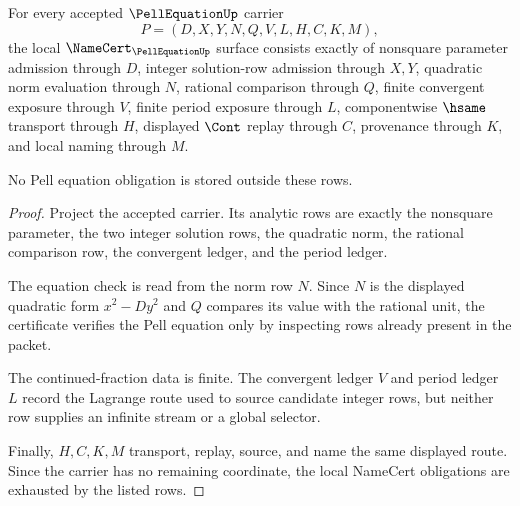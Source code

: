\begin{theorem}
\label{thm:pell-equation-namecert-obligations}
For every accepted $\PellEquationUp$ carrier
$$
P=(D,X,Y,N,Q,V,L,H,C,K,M),
$$
the local $\NameCert_{\PellEquationUp}$ surface consists exactly of nonsquare parameter admission through $D$, integer solution-row admission through $X,Y$, quadratic norm evaluation through $N$, rational comparison through $Q$, finite convergent exposure through $V$, finite period exposure through $L$, componentwise $\hsame$ transport through $H$, displayed $\Cont$ replay through $C$, provenance through $K$, and local naming through $M$.

No Pell equation obligation is stored outside these rows.
\end{theorem}
\begin{proof}
Project the accepted carrier. Its analytic rows are exactly the nonsquare parameter, the two integer solution rows, the quadratic norm, the rational comparison row, the convergent ledger, and the period ledger.

The equation check is read from the norm row $N$. Since $N$ is the displayed quadratic form $x^2-Dy^2$ and $Q$ compares its value with the rational unit, the certificate verifies the Pell equation only by inspecting rows already present in the packet.

The continued-fraction data is finite. The convergent ledger $V$ and period ledger $L$ record the Lagrange route used to source candidate integer rows, but neither row supplies an infinite stream or a global selector.

Finally, $H,C,K,M$ transport, replay, source, and name the same displayed route. Since the carrier has no remaining coordinate, the local NameCert obligations are exhausted by the listed rows.
\end{proof}

